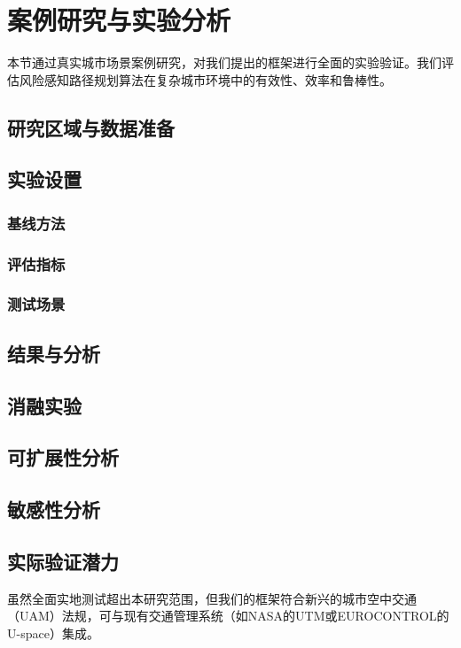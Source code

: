 
\section{案例研究与实验分析}
\label{sec:case_study}

本节通过真实城市场景案例研究，对我们提出的框架进行全面的实验验证。我们评估风险感知路径规划算法在复杂城市环境中的有效性、效率和鲁棒性。

\subsection{研究区域与数据准备}



\subsection{实验设置}

\subsubsection{基线方法}


\subsubsection{评估指标}


\subsubsection{测试场景}


\subsection{结果与分析}



\subsection{消融实验}


\subsection{可扩展性分析}


\subsection{敏感性分析}


\subsection{实际验证潜力}

虽然全面实地测试超出本研究范围，但我们的框架符合新兴的城市空中交通（UAM）法规，可与现有交通管理系统（如NASA的UTM或EUROCONTROL的U-space）集成。
